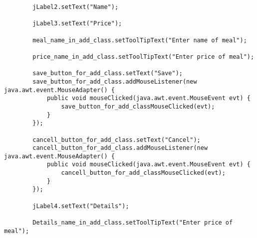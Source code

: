 \documentclass[12pt,a4paper]{article}
\begin{document}
\begin{lstlisting}
        jLabel2.setText("Name");

        jLabel3.setText("Price");

        meal_name_in_add_class.setToolTipText("Enter name of meal");

        price_name_in_add_class.setToolTipText("Enter price of meal");

        save_button_for_add_class.setText("Save");
        save_button_for_add_class.addMouseListener(new java.awt.event.MouseAdapter() {
            public void mouseClicked(java.awt.event.MouseEvent evt) {
                save_button_for_add_classMouseClicked(evt);
            }
        });

        cancell_button_for_add_class.setText("Cancel");
        cancell_button_for_add_class.addMouseListener(new java.awt.event.MouseAdapter() {
            public void mouseClicked(java.awt.event.MouseEvent evt) {
                cancell_button_for_add_classMouseClicked(evt);
            }
        });

        jLabel4.setText("Details");

        Details_name_in_add_class.setToolTipText("Enter price of meal");


\end{lstlisting}
\end{document}
